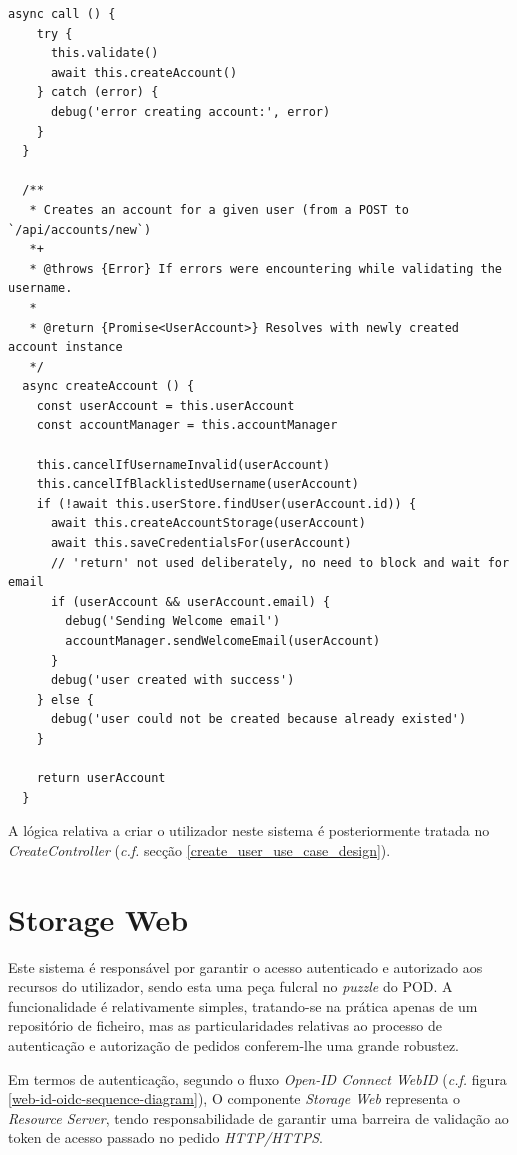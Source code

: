 \begin{lstlisting}[caption={código CreateAccountController}]
async call () {
    try {
      this.validate()
      await this.createAccount()
    } catch (error) {
      debug('error creating account:', error)
    }
  }

  /**
   * Creates an account for a given user (from a POST to `/api/accounts/new`)
   *+
   * @throws {Error} If errors were encountering while validating the username.
   *
   * @return {Promise<UserAccount>} Resolves with newly created account instance
   */
  async createAccount () {
    const userAccount = this.userAccount
    const accountManager = this.accountManager

    this.cancelIfUsernameInvalid(userAccount)
    this.cancelIfBlacklistedUsername(userAccount)
    if (!await this.userStore.findUser(userAccount.id)) {
      await this.createAccountStorage(userAccount)
      await this.saveCredentialsFor(userAccount)
      // 'return' not used deliberately, no need to block and wait for email
      if (userAccount && userAccount.email) {
        debug('Sending Welcome email')
        accountManager.sendWelcomeEmail(userAccount)
      }
      debug('user created with success')
    } else {
      debug('user could not be created because already existed')
    }

    return userAccount
  }

\end{lstlisting}

A lógica relativa a criar o utilizador neste sistema é posteriormente tratada no \emph{CreateController} (\emph{c.f.} secção \ref{create_user_use_case_design}).

\section{Storage Web}
Este sistema é responsável por garantir o acesso autenticado e autorizado aos recursos do utilizador, sendo esta uma peça fulcral no \emph{puzzle} do POD. A funcionalidade é relativamente simples, tratando-se na prática apenas de um repositório de ficheiro, mas as particularidades relativas ao processo de autenticação e autorização de pedidos conferem-lhe uma grande robustez.

Em termos de autenticação, segundo o fluxo \emph{Open-ID Connect WebID} (\emph{c.f.} figura \ref{web-id-oidc-sequence-diagram}), O componente \emph{Storage Web} representa o \emph{Resource Server}, tendo responsabilidade de garantir uma barreira de validação ao token de acesso passado no pedido \emph{HTTP/HTTPS}.

